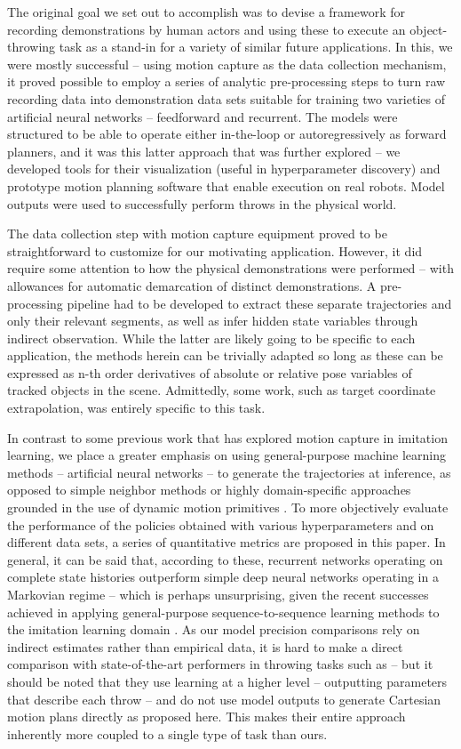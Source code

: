\documentclass{article}
\begin{document}
The original goal we set out to accomplish was to devise a framework for recording demonstrations by human actors and using these to execute an object-throwing task as a stand-in for a variety of similar future applications. In this, we were mostly successful -- using motion capture as the data collection mechanism, it proved possible to employ a series of analytic pre-processing steps to turn raw recording data into demonstration data sets suitable for training two varieties of artificial neural networks -- feedforward and recurrent. The models were structured to be able to operate either in-the-loop or autoregressively as forward planners, and it was this latter approach that was further explored -- we developed tools for their visualization (useful in hyperparameter discovery) and prototype motion planning software that enable execution on real robots. Model outputs were used to successfully perform throws in the physical world.

The data collection step with motion capture equipment proved to be straightforward to customize for our motivating application. However, it did require some attention to how the physical demonstrations were performed -- with allowances for automatic demarcation of distinct demonstrations. A pre-processing pipeline had to be developed to extract these separate trajectories and only their relevant segments, as well as infer hidden state variables through indirect observation. While the latter are likely going to be specific to each application, the methods herein can be trivially adapted so long as these can be expressed as n-th order derivatives of absolute or relative pose variables of tracked objects in the scene. Admittedly, some work, such as target coordinate extrapolation, was entirely specific to this task. 

In contrast to some previous work that has explored motion capture in imitation learning, we place a greater emphasis on using general-purpose machine learning methods -- artificial neural networks -- to generate the trajectories at inference, as opposed to simple neighbor methods \citep{jha2017imitation} or highly domain-specific approaches grounded in the use of dynamic motion primitives \citep{vuga2013mocap}. To more objectively evaluate the performance of the policies obtained with various hyperparameters and on different data sets, a series of quantitative metrics are proposed in this paper. In general, it can be said that, according to these, recurrent networks operating on complete state histories outperform simple deep neural networks operating in a Markovian regime -- which is perhaps unsurprising, given the recent successes achieved in applying general-purpose sequence-to-sequence learning methods to the imitation learning domain \citep{reed2022generalist}. As our model precision comparisons rely on indirect estimates rather than empirical data, it is hard to make a direct comparison with state-of-the-art performers in throwing tasks such as \citep{zeng2020tossingbot} -- but it should be noted that they use learning at a higher level -- outputting parameters that describe each throw -- and do not use model outputs to generate Cartesian motion plans directly as proposed here. This makes their entire approach inherently more coupled to a single type of task than ours.
\end{document}
